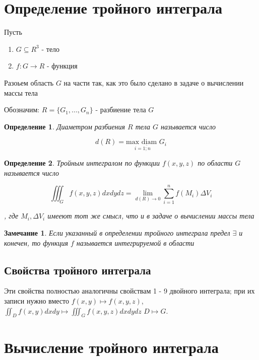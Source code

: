 \documentclass[a4paper, 14pt]{report}
\newtheorem{defenition}{Определение}[section]
\newtheorem{note}{Замечание}[section]
\begin{document}
\section{Определение тройного интеграла}

Пусть 

\begin{enumerate}
    \item $G \subseteq R^3$ - тело
    \item $f:G \to R$ - функция
\end{enumerate}

Разоьем область $G$ на части так, как это было сделано в задаче о вычислении массы тела

Обозначим: $R = \{G_1,...,G_n\}$ - разбиение тела $G$

\begin{defenition}
    Диаметром разбиения $R$ тела $G$ называется число

    $$
    d(R) = \underset{i = \overline{1;n}}{\text{max diam }} G_i
    $$
\end{defenition}

\begin{defenition}
    Тройным интегралом по функции $f(x,y,z)$ по области $G$ называется число 

    $$
    \iiint_G f(x,y,z) dxdydz = \lim_{d(R) \to 0} \sum_{i=1}^n f(M_i) \Delta V_i
    $$

    , где $M_i, \Delta V_i$ имееют тот же смысл, что и в задаче о вычислении массы тела
\end{defenition}

\begin{note}
    Если указанный в определении тройного интеграла предел $\exists$ и конечен, то функция $f$ называется интегрируемой в области 
\end{note}

\subsection{Свойства тройного интеграла}

Эти свойства полностью аналогичны свойствам 1 - 9 двойного интеграла; при их записи нужно вместо $f(x,y) \mapsto f(x,y,z)$, $\iint_D f(x,y) dxdy \mapsto \iiint_G f(x,y,z) dxdydz$ $D \mapsto G$.

\section{Вычисление тройного интеграла}
\end{document}
